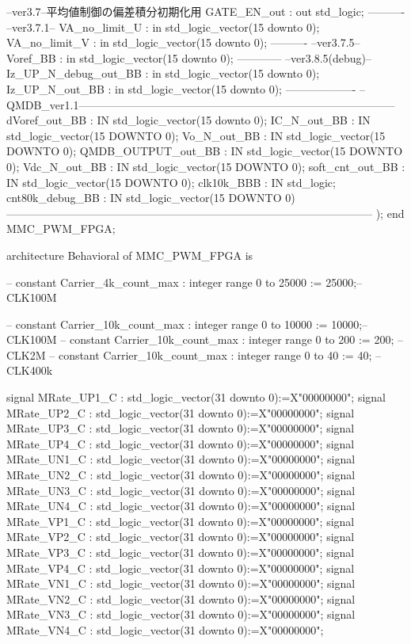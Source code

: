 \begin{mylisting}[language=VHDL,caption=ゲート信号出力モジュール,label=MMC_PWM_GEN_module_VHDL]
		--ver3.7--平均値制御の偏差積分初期化用
		GATE_EN_out : out std_logic;
		----------
		--ver3.7.1--
		VA_no_limit_U : in std_logic_vector(15 downto 0);
		VA_no_limit_V : in std_logic_vector(15 downto 0);
		----------
		--ver3.7.5--
		Voref_BB	: in std_logic_vector(15 downto 0);
		------------
		--ver3.8.5(debug)--
		Iz_UP_N_debug_out_BB : in std_logic_vector(15 downto 0);
		Iz_UP_N_out_BB 		: in std_logic_vector(15 downto 0);
		-------------------
--QMDB_ver1.1--------------------------------------------------------------------------------------
		dVoref_out_BB        : IN     std_logic_vector(15 downto 0);
		IC_N_out_BB	        : IN   	std_logic_vector(15 DOWNTO 0);
		Vo_N_out_BB	        : IN 	   std_logic_vector(15 DOWNTO 0);
		QMDB_OUTPUT_out_BB   : IN     std_logic_vector(15 DOWNTO 0);
		Vdc_N_out_BB		    : IN     std_logic_vector(15 DOWNTO 0);
		soft_cnt_out_BB	      : IN     std_logic_vector(15 DOWNTO 0);
		clk10k_BBB           : IN     std_logic;
		cnt80k_debug_BB		: IN 		std_logic_vector(15 DOWNTO 0)
---------------------------------------------------------------------------------------------------
		);
end MMC_PWM_FPGA;

architecture Behavioral of MMC_PWM_FPGA is

--	constant Carrier_4k_count_max			: integer range 0 to 25000						:= 25000;--CLK100M
	
--	constant Carrier_10k_count_max		: integer range 0 to 10000						:= 10000;--CLK100M
--	constant Carrier_10k_count_max		: integer range 0 to 200						:= 200;	--CLK2M
--	constant Carrier_10k_count_max		: integer range 0 to 40							:= 40;	--CLK400k

	signal 	MRate_UP1_C						: std_logic_vector(31 downto 0):=X"00000000";
	signal 	MRate_UP2_C						: std_logic_vector(31 downto 0):=X"00000000";
	signal 	MRate_UP3_C						: std_logic_vector(31 downto 0):=X"00000000";
	signal 	MRate_UP4_C						: std_logic_vector(31 downto 0):=X"00000000";
	signal 	MRate_UN1_C						: std_logic_vector(31 downto 0):=X"00000000";
	signal 	MRate_UN2_C						: std_logic_vector(31 downto 0):=X"00000000";
	signal 	MRate_UN3_C						: std_logic_vector(31 downto 0):=X"00000000";
	signal 	MRate_UN4_C						: std_logic_vector(31 downto 0):=X"00000000";
	signal 	MRate_VP1_C						: std_logic_vector(31 downto 0):=X"00000000";
	signal 	MRate_VP2_C						: std_logic_vector(31 downto 0):=X"00000000";
	signal 	MRate_VP3_C						: std_logic_vector(31 downto 0):=X"00000000";
	signal 	MRate_VP4_C						: std_logic_vector(31 downto 0):=X"00000000";
	signal 	MRate_VN1_C						: std_logic_vector(31 downto 0):=X"00000000";
	signal 	MRate_VN2_C						: std_logic_vector(31 downto 0):=X"00000000";
	signal 	MRate_VN3_C						: std_logic_vector(31 downto 0):=X"00000000";
	signal 	MRate_VN4_C						: std_logic_vector(31 downto 0):=X"00000000";
	

\end{mylisting}
